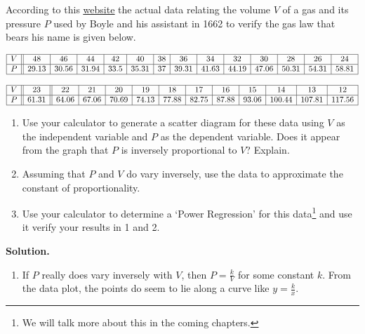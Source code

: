 \begin{ex}  According to this \href{http://web.lemoyne.edu/~giunta/classicalcs/boyleverify.html}{\underline{website}} the actual data relating the volume $V$ of a gas and its pressure $P$ used by Boyle and his assistant in 1662 to verify the gas law that bears his name is given below.

\[ \begin{array}{|c||c|c|c|c|c|c|c|c|c|c|c|c|c|}  \hline

V & 48 & 46 & 44 & 42 & 40 & 38 & 36 & 34 & 32 & 30 & 28 & 26 & 24  \\ \hline

P & 29.13 & 30.56 & 31.94 & 33.5 & 35.31 & 37 & 39.31 & 41.63 & 44.19 & 47.06 & 50.31 & 54.31 & 58.81  \\ \hline \end{array} \]


\[\begin{array}{|c||c||c|c|c|c|c|c|c|c|c|c|c|c|} \hline

V & 23 & 22 & 21 & 20 & 19 & 18 & 17 & 16 & 15 & 14 & 13 & 12  \\ \hline 

P & 61.31 & 64.06 & 67.06 & 70.69 & 74.13 & 77.88 & 82.75 & 87.88 & 93.06 & 100.44 & 107.81 & 117.56   \\ \hline \end{array} \]

\begin{enumerate}

\item  Use your calculator to generate a scatter diagram for these data using $V$ as the independent variable and $P$ as the dependent variable.  Does it appear from the graph that $P$ is inversely proportional to $V$?  Explain.

\item  Assuming that $P$ and $V$ do vary inversely, use the data to approximate the constant of proportionality.

\item  Use your calculator to determine a `Power Regression' for this data\footnote{We will talk more about this in the coming chapters.} and use it verify your results in 1 and 2.


\end{enumerate}


{\bf Solution.}


\begin{enumerate}

\item If $P$ really does vary inversely with $V$, then $P = \frac{k}{V}$ for some constant $k$.  From the data plot, the points do seem to lie along a curve like $y = \frac{k}{x}$.


\end{enumerate}
\end{ex}
